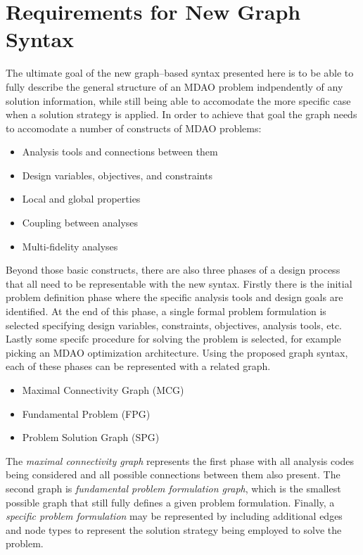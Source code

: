 \newcommand{\st}{ \ | \ }

\section{Requirements for New Graph Syntax}
The ultimate goal of the new graph--based syntax presented here is to be able to 
fully describe the general structure of an MDAO problem indpendently of any solution information, 
while still being able to accomodate the more specific case when a solution 
strategy is applied. In order to achieve that goal 
the graph needs to accomodate a number of constructs of MDAO problems: 

\begin{itemize}
    \item Analysis tools and connections between them
    \item Design variables, objectives, and constraints
    \item Local and global properties
    \item Coupling between analyses
    \item Multi-fidelity analyses
\end{itemize}

Beyond those basic constructs, there are also three phases of a design process that 
all need to be representable with the new syntax. Firstly there is the initial problem definition
phase where the specific analysis tools and design goals are identified. At the end of this phase, 
a single formal problem formulation is selected specifying design variables, constraints, objectives, 
analysis tools, etc. Lastly some specifc procedure for solving the problem is selected, for example 
picking an MDAO optimization architecture. Using the proposed graph syntax, each of these phases 
can be represented with a related graph. 

\begin{itemize}
    \item Maximal Connectivity Graph (MCG)
    \item Fundamental Problem  (FPG)
    \item Problem Solution Graph (SPG)
\end{itemize}

The \emph{maximal connectivity graph} represents the first phase with all 
analysis codes being considered and all possible connections between them also present. The second graph 
is \emph{fundamental problem formulation graph}, which is the smallest possible graph 
that still fully defines a given problem formulation. Finally, a \emph{specific problem formulation} 
may be represented by including additional edges and node types to represent the 
solution strategy being employed to solve the problem. 

